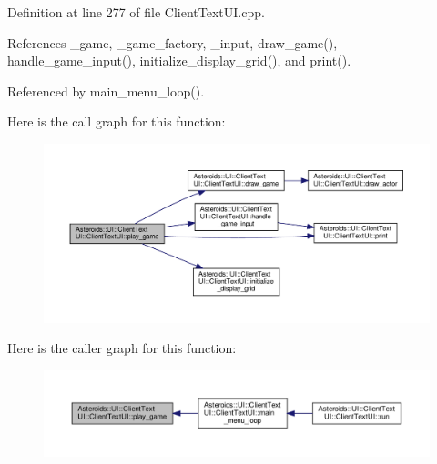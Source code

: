 Definition at line 277 of file Client\+Text\+U\+I.\+cpp.



References \+\_\+game, \+\_\+game\+\_\+factory, \+\_\+input, draw\+\_\+game(), handle\+\_\+game\+\_\+input(), initialize\+\_\+display\+\_\+grid(), and print().



Referenced by main\+\_\+menu\+\_\+loop().

Here is the call graph for this function\+:
\nopagebreak
\begin{figure}[H]
\begin{center}
\leavevmode
\includegraphics[width=350pt]{classAsteroids_1_1UI_1_1ClientTextUI_1_1ClientTextUI_aa0cb16ae0f3edc7efed1ec8c5d7bf94d_cgraph}
\end{center}
\end{figure}
Here is the caller graph for this function\+:
\nopagebreak
\begin{figure}[H]
\begin{center}
\leavevmode
\includegraphics[width=350pt]{classAsteroids_1_1UI_1_1ClientTextUI_1_1ClientTextUI_aa0cb16ae0f3edc7efed1ec8c5d7bf94d_icgraph}
\end{center}
\end{figure}
\mbox{\label{classAsteroids_1_1UI_1_1ClientTextUI_1_1ClientTextUI_a41f904ea570af3e3a8c4d70da8411ef3}} 
